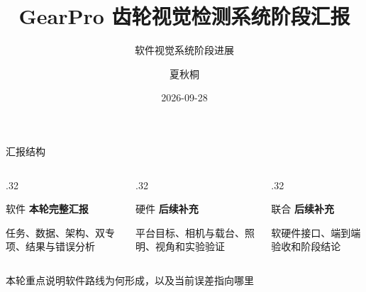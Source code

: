 \documentclass[aspectratio=169,10pt]{beamer}
\author{夏秋桐}
\title{GearPro 齿轮视觉检测系统阶段汇报}
\subtitle{软件视觉系统阶段进展}
\date{2026-09-28}
\newcommand{\OverviewNav}{%
  \GearProSetMajor{总览}%
  \GearProHideMinorNav%
}
\begin{document}
\begin{frame}[plain]
  \titlepage
\end{frame}

\OverviewNav
\begin{frame}{汇报结构}
  \vspace{.25em}
  \begin{columns}[T,onlytextwidth]
    \begin{column}{.32\textwidth}
      \begin{block}{软件}
        \textbf{本轮完整汇报}

        \vspace{.45em}
        任务、数据、架构、双专项、结果与错误分析
      \end{block}
    \end{column}
    \begin{column}{.32\textwidth}
      \begin{exampleblock}{硬件}
        \textbf{后续补充}

        \vspace{.45em}
        平台目标、相机与载台、照明、视角和实验验证
      \end{exampleblock}
    \end{column}
    \begin{column}{.32\textwidth}
      \begin{exampleblock}{联合}
        \textbf{后续补充}

        \vspace{.45em}
        软硬件接口、端到端验收和阶段结论
      \end{exampleblock}
    \end{column}
  \end{columns}

  \vfill
  \centering
  \textcolor{seugreen}{\large 本轮重点说明软件路线为何形成，以及当前误差指向哪里}
\end{frame}
\end{document}
